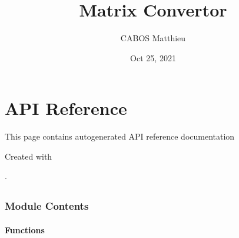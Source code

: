 \documentclass[letterpaper,10pt,english]{sphinxmanual}
\title{Matrix Convertor}
\date{Oct 25, 2021}
\author{CABOS Matthieu}
\begin{document}
\pagestyle{empty}
\sphinxmaketitle
\pagestyle{plain}
\sphinxtableofcontents
\pagestyle{normal}
\label{\detokenize{index::doc}}



\chapter{API Reference}
\label{\detokenize{autoapi/index:api-reference}}\label{\detokenize{autoapi/index::doc}}
\sphinxAtStartPar
This page contains auto\sphinxhyphen{}generated API reference documentation %
\begin{footnote}[1]\sphinxAtStartFootnote
Created with 
%
\end{footnote}.


\section{}
\label{\detokenize{autoapi/Matrix_convertor/index:module-Matrix_convertor}}\label{\detokenize{autoapi/Matrix_convertor/index:matrix-convertor}}\label{\detokenize{autoapi/Matrix_convertor/index::doc}}

\subsection{Module Contents}
\label{\detokenize{autoapi/Matrix_convertor/index:module-contents}}

\subsubsection{Functions}
\label{\detokenize{autoapi/Matrix_convertor/index:functions}}
\end{document}
